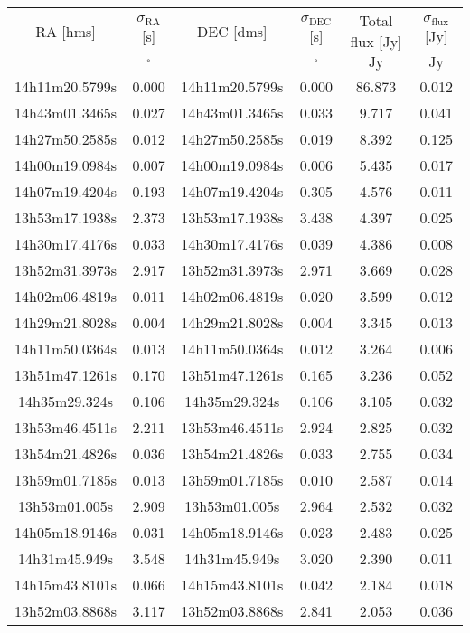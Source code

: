 \begin{table}
\begin{tabular}{cccccc}
RA [hms] & $\sigma_\mathrm{RA}$ [s] & DEC [dms] & $\sigma_\mathrm{DEC}$ [s] & Total flux [Jy] & $\sigma_\mathrm{flux}$ [Jy] \\
 & $\mathrm{{}^{\circ}}$ &  & $\mathrm{{}^{\circ}}$ & $\mathrm{Jy}$ & $\mathrm{Jy}$ \\
14h11m20.5799s & 0.000 & 14h11m20.5799s & 0.000 & 86.873 & 0.012 \\
14h43m01.3465s & 0.027 & 14h43m01.3465s & 0.033 & 9.717 & 0.041 \\
14h27m50.2585s & 0.012 & 14h27m50.2585s & 0.019 & 8.392 & 0.125 \\
14h00m19.0984s & 0.007 & 14h00m19.0984s & 0.006 & 5.435 & 0.017 \\
14h07m19.4204s & 0.193 & 14h07m19.4204s & 0.305 & 4.576 & 0.011 \\
13h53m17.1938s & 2.373 & 13h53m17.1938s & 3.438 & 4.397 & 0.025 \\
14h30m17.4176s & 0.033 & 14h30m17.4176s & 0.039 & 4.386 & 0.008 \\
13h52m31.3973s & 2.917 & 13h52m31.3973s & 2.971 & 3.669 & 0.028 \\
14h02m06.4819s & 0.011 & 14h02m06.4819s & 0.020 & 3.599 & 0.012 \\
14h29m21.8028s & 0.004 & 14h29m21.8028s & 0.004 & 3.345 & 0.013 \\
14h11m50.0364s & 0.013 & 14h11m50.0364s & 0.012 & 3.264 & 0.006 \\
13h51m47.1261s & 0.170 & 13h51m47.1261s & 0.165 & 3.236 & 0.052 \\
14h35m29.324s & 0.106 & 14h35m29.324s & 0.106 & 3.105 & 0.032 \\
13h53m46.4511s & 2.211 & 13h53m46.4511s & 2.924 & 2.825 & 0.032 \\
13h54m21.4826s & 0.036 & 13h54m21.4826s & 0.033 & 2.755 & 0.034 \\
13h59m01.7185s & 0.013 & 13h59m01.7185s & 0.010 & 2.587 & 0.014 \\
13h53m01.005s & 2.909 & 13h53m01.005s & 2.964 & 2.532 & 0.032 \\
14h05m18.9146s & 0.031 & 14h05m18.9146s & 0.023 & 2.483 & 0.025 \\
14h31m45.949s & 3.548 & 14h31m45.949s & 3.020 & 2.390 & 0.011 \\
14h15m43.8101s & 0.066 & 14h15m43.8101s & 0.042 & 2.184 & 0.018 \\
13h52m03.8868s & 3.117 & 13h52m03.8868s & 2.841 & 2.053 & 0.036 \\

\end{tabular}
\end{table}
